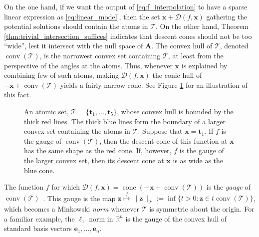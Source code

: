 On the one hand, if we want the output of \eqref{eq:f_interpolation} to have a sparse linear expression as \eqref{eq:linear_model}, then the set $\mathbf{x} + \mathcal{D}(f, \mathbf{x})$ gathering the potential solutions should contain the atoms in $\mathcal{T}$. On the other hand, Theorem \ref{thm:trivial_intersection_suffices} indicates that descent cones should not be too ``wide'', lest it intersect with the null space of $\mathbf{A}$. The convex hull of $\mathcal{T}$, denoted $\operatorname{conv}(\mathcal{T})$, is the narrowest convex set containing $\mathcal{T}$, at least from the perspective of the angles at the atoms. Thus, whenever $\mathbf{x}$ is explained by combining few of such atoms, making $\mathcal{D}(f, \mathbf{x})$ the conic hull of $-\mathbf{x} + \operatorname{conv}(\mathcal{T})$ yields a fairly narrow cone. See Figure \ref{fig:illustration_convex_hull} for an illustration of this fact.

\clearpage

\begin{figure}[H]
    \centering
    
    \caption[An atomic set and related descent cones]{An atomic set, $\mathcal{T} = \{\mathbf{t}_1, \dots, \mathbf{t}_5\}$, whose convex hull is bounded by the thick red lines. The thick blue lines form the boundary of a larger convex set containing the atoms in $\mathcal{T}$. Suppose that $\mathbf{x} = \mathbf{t}_1$. If $f$ is the gauge of $\operatorname{conv} \left ( \mathcal{T} \right )$, then the descent cone of this function at $\mathbf{x}$ has the same shape as the red cone. If, however, $f$ is the gauge of the larger convex set, then its descent cone at $\mathbf{x}$ is as wide as the blue cone.}
    \label{fig:illustration_convex_hull}
\end{figure}

The function $f$ for which $\mathcal{D}(f, \mathbf{x}) = \operatorname{cone} \left ( -\mathbf{x} + \operatorname{conv}(\mathcal{T}) \right )$ is the \emph{gauge} of $\operatorname{conv}(\mathcal{T})$~\cite{chandrasekaran2012}. This gauge is the map $\mathbf{z} \overset{f}{\mapsto} \|\mathbf{z}\|_{\mathcal{T}} := \inf \{ t > 0 : \mathbf{z} \in t \operatorname{conv}(\mathcal{T})\}$, which becomes a Minkowski \emph{norm} whenever $\mathcal{T}$ is symmetric about the origin. For a familiar example, the $\ell_1$ norm in $\mathbb{R}^{n}$ is the gauge of the convex hull of standard basis vectors $\mathbf{e}_1, \dots, \mathbf{e}_n$.


